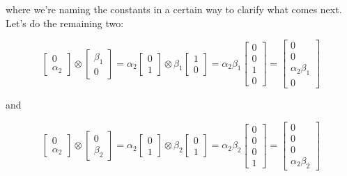 \documentclass[main.tex]{subfiles}
\begin{document}
    where we're naming the constants in a certain way to clarify what comes next. Let's do the remaining two:
    
    $$
    \left[\begin{array}{c}
    0 \\
    \alpha_{2}
    \end{array}\right] \otimes\left[\begin{array}{c}
    \beta_{1} \\
    0
    \end{array}\right]=\alpha_{2}\left[\begin{array}{l}
    0 \\
    1
    \end{array}\right] \otimes \beta_{1}\left[\begin{array}{l}
    1 \\
    0
    \end{array}\right]=\alpha_{2} \beta_{1}\left[\begin{array}{l}
    0 \\
    0 \\
    1 \\
    0
    \end{array}\right]=\left[\begin{array}{c}
    0 \\
    0 \\
    \alpha_{2} \beta_{1} \\
    0
    \end{array}\right]
    $$
    
    and
    
    $$
    \left[\begin{array}{c}
    0 \\
    \alpha_{2}
    \end{array}\right] \otimes\left[\begin{array}{c}
    0 \\
    \beta_{2}
    \end{array}\right]=\alpha_{2}\left[\begin{array}{l}
    0 \\
    1
    \end{array}\right] \otimes \beta_{2}\left[\begin{array}{l}
    0 \\
    1
    \end{array}\right]=\alpha_{2} \beta_{2}\left[\begin{array}{l}
    0 \\
    0 \\
    0 \\
    1
    \end{array}\right]=\left[\begin{array}{c}
    0 \\
    0 \\
    0 \\
    \alpha_{2} \beta_{2}
    \end{array}\right]
    $$
    
\end{document}

